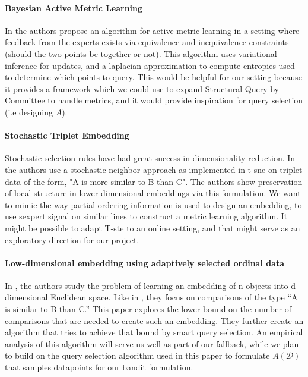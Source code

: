 \documentclass{article}
\begin{document}
\paragraph{Bayesian Active Metric Learning} 
In \cite{bayesian-metric} the authors propose an algorithm for active metric learning in a setting where feedback from the experts exists via equivalence and inequivalence constraints (should the two points be together or not).
This algorithm uses variational inference for updates, and a laplacian approximation to compute entropies used to determine which points to query. 
This would be helpful for our setting because it provides a framework which we could use to expand Structural Query by Committee to handle metrics, and it would provide inspiration for query selection (i.e designing  $A$).

\paragraph{Stochastic Triplet Embedding}
Stochastic selection rules have had great success in dimensionality reduction. In \cite{6349720} the authors use a stochastic neighbor approach as implemented in t-sne on triplet data of the form, "A is more similar to B than C". The authors show preservation of local structure in lower dimensional embeddings via this formulation. We want to mimic the way partial ordering information is used to design an embedding, to use sexpert signal on similar lines to construct a metric learning algorithm. It might be possible to adapt T-ste to an online setting, and that might serve as an exploratory direction for our project. 

\paragraph{Low-dimensional embedding using adaptively selected ordinal data}
In \cite{6120287}, the authors study the problem of learning an embedding of n objects into d-dimensional Euclidean space. Like  in \cite{6349720}, they focus on comparisons of the type “A is similar to B than C.” This paper explores the lower bound on the number of comparisons that are needed to create such an embedding. They further create an algorithm that tries to achieve that bound by smart query selection. An empirical analysis of this algorithm will serve us well as part of our fallback, while we plan to build on the query selection algorithm used in this paper to formulate $A(\mathcal{D})$ that samples datapoints for our bandit formulation. 






\end{document}
